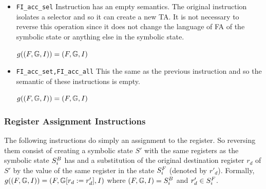 \begin{itemize}
	\item {\tt FI\_acc\_sel}
		Instruction has an empty semantics.
		The original instruction isolates a selector
		and so it can create a new TA.
		It is not necessary to reverse this operation
		since it does not change the language of FA of the
		symbolic state or anything else in the symbolic state.
		
		$g((F, \mathbb{G}, I)) = (F, \mathbb{G}, I)$

	\item {\tt FI\_acc\_set,FI\_acc\_all}
		This the same as the previous instruction and so
		the semantic of these instructions is empty.
		
		$g((F, \mathbb{G}, I)) = (F, \mathbb{G}, I)$

\end{itemize}

\subsubsection{Register Assignment Instructions}
The following instructions do simply an assignment to the register.
So reversing them consist of creating a symbolic state $S'$ with
the same registers as the symbolic state $S^{B}_{i}$ has
and a substitution of the original destination register $r_d$ of $S'$
by the value of the same register in the state $S^{F}_{i}$ (denoted by $r'_d$).
Formally, $g((F, \mathbb{G}, I)) = (F, \mathbb{G} [r_{d} := r'_{d}]
			, I)$
			where $(F, \mathbb{G}, I) = S^{B}_{i}$ and $r'_{d} \in S^{F}_{i}$.

